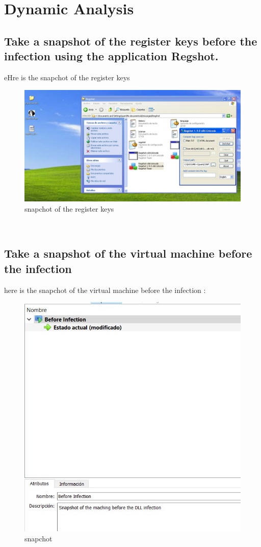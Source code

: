 \documentclass[12pt,letter]{article} %
\begin{document}

    \section{Dynamic Analysis}

        \subsection{Take a snapshot of the register keys before the infection using the application Regshot.}
            eHre is the snapchot of the register keys
            \\
            \begin{figure}[h!]
                \centering
                \includegraphics[width=0.5\linewidth]{punto1.jpeg}
                \caption{snapchot of the register keys}
                \label{snapchot register keys}
            \end{figure}
            \\

        \subsection{Take a snapshot of the virtual machine before the infection}
            here is the snapchot of the virtual machine before the infection  :
            \\
            \begin{figure}[h!]
                \centering
                \includegraphics[width=0.5\linewidth]{punto2.jpeg}
                \caption{snapchot}
                \label{snapchot of the virtual machine before the infection}
            \end{figure}
            \\
\end{document}
